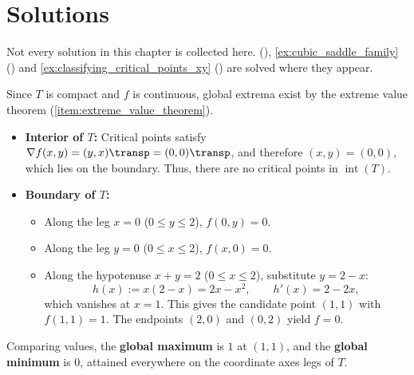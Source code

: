 
\section{Solutions}
\label{sec:extrema_solutions}

Not every solution in this chapter is collected here. 
(), \cref{ex:cubic_saddle_family}
() and \cref{ex:classifying_critical_points_xy}
() are solved where they appear.

\begin{exercisesolution}
\label{sol:ai_extrema_triangle}
Since $T$ is compact and $f$ is continuous, global extrema exist by the extreme value theorem
(\cref{item:extreme_value_theorem}).
\begin{itemize}
  \item \textbf{Interior of $T$:} Critical points satisfy $\nabla f(x,y) = (y,x)\transp = (0,0)\transp$, and therefore $(x,y) = (0,0)$, which lies on the boundary. Thus, there are no critical points in $\operatorname{int}(T)$.
  \item \textbf{Boundary of $T$:}
    \begin{itemize}
      \item Along the leg $x = 0$ ($0 \le y \le 2$), $f(0,y) = 0$.
      \item Along the leg $y = 0$ ($0 \le x \le 2$), $f(x,0) = 0$.
      \item Along the hypotenuse $x+y = 2$ ($0 \le x \le 2$), substitute $y = 2-x$:
        \[h(x) := x(2-x) = 2x-x^2, \qquad h'(x) = 2-2x,\]
        which vanishes at $x = 1$. This gives the candidate point $(1,1)$ with $f(1,1) = 1$. The endpoints $(2,0)$ and $(0,2)$ yield $f = 0$.
    \end{itemize}
\end{itemize}
Comparing values, the \textbf{global maximum} is $1$ at $(1,1)$, and the \textbf{global minimum} is $0$, attained everywhere on the coordinate axes legs of $T$.
\end{exercisesolution}

